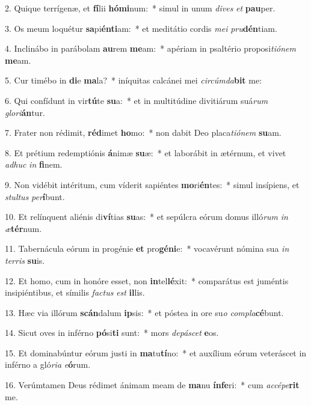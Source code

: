 2. Quique terrígenæ, et \textbf{fí}lii \textbf{hó}\textbf{mi}num:~*  simul in unum \textit{di}\textit{ves} \textit{et} \textbf{pau}per.\

3. Os meum loquétur \textbf{sa}pi\textbf{én}\textbf{ti}am:~*  et meditátio cordis \textit{me}\textit{i} \textit{pru}\textbf{dén}tiam.\

4. Inclinábo in parábolam \textbf{au}rem \textbf{me}am:~*  apériam in psaltério proposi\textit{ti}\textit{ó}\textit{nem} \textbf{me}am.\

5. Cur timébo in \textbf{di}e \textbf{ma}la?~*  iníquitas calcánei mei \textit{cir}\textit{cúm}\textit{da}\textbf{bit} me:\

6. Qui confídunt in vir\textbf{tú}te \textbf{su}a:~*  et in multitúdine divitiárum suá\textit{rum} \textit{glo}\textit{ri}\textbf{án}tur.\

7. Frater non rédimit, \textbf{réd}imet \textbf{ho}mo:~*  non dabit Deo placa\textit{ti}\textit{ó}\textit{nem} \textbf{su}am.\

8. Et prétium redemptiónis \textbf{á}nimæ \textbf{su}æ:~*  et laborábit in ætérnum, et vivet \textit{ad}\textit{huc} \textit{in} \textbf{fi}nem.\

9. Non vidébit intéritum, cum víderit sapiéntes \textbf{mo}ri\textbf{én}tes:~*  simul insípiens, et \textit{stul}\textit{tus} \textit{per}\textbf{í}bunt.\

10. Et relínquent aliénis di\textbf{ví}tias \textbf{su}as:~*  et sepúlcra eórum domus illó\textit{rum} \textit{in} \textit{æ}\textbf{tér}num.\

11. Tabernácula eórum in progénie \textbf{et} pro\textbf{gé}\textbf{ni}e:~*  vocavérunt nómina sua \textit{in} \textit{ter}\textit{ris} \textbf{su}is.\

12. Et homo, cum in honóre esset, non \textbf{in}tel\textbf{lé}xit:~*  comparátus est juméntis insipiéntibus, et símilis \textit{fac}\textit{tus} \textit{est} \textbf{il}lis.\

13. Hæc via illórum \textbf{scán}dalum \textbf{ip}sis:~*  et póstea in ore su\textit{o} \textit{com}\textit{pla}\textbf{cé}bunt.\

14. Sicut oves in inférno \textbf{pó}si\textbf{ti} sunt:~*  mors \textit{de}\textit{pá}\textit{scet} \textbf{e}os.\

15. Et dominabúntur eórum justi in \textbf{ma}tu\textbf{tí}no:~*  et auxílium eórum veteráscet in inférno a gló\textit{ri}\textit{a} \textit{e}\textbf{ó}rum.\

16. Verúmtamen Deus rédimet ánimam meam de \textbf{ma}nu \textbf{ín}\textbf{fe}ri:~*  cum \textit{ac}\textit{cé}\textit{pe}\textbf{rit} me.\

